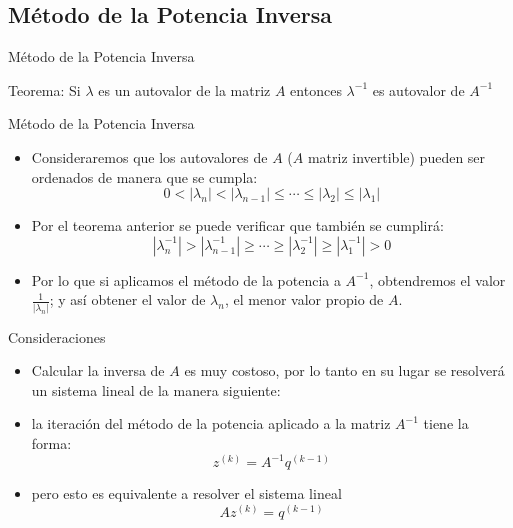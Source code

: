 \documentclass[11pt]{beamer}
\begin{document}
  \subsection{M\'etodo de la Potencia Inversa}
  \begin{frame}{M\'etodo de la Potencia Inversa}
    \begin{block}{Teorema:}
      Si $\lambda$ es un autovalor de la matriz $A$ entonces $\lambda^{-1}$ es autovalor
      de $A^{-1}$
      \end{block}
\end{frame}
\begin{frame}{M\'etodo de la Potencia Inversa}
  \begin{itemize}
    \item Consideraremos que los autovalores de $A$ ($A$ matriz invertible) pueden ser ordenados de manera que se cumpla:
    $$
    0 < |\lambda_n| < |\lambda_{n-1}| \leq \cdots \leq |\lambda_2| \leq |\lambda_1|
    $$
    \item<2-> Por el teorema anterior se puede verificar que tambi\'en se cumplir\'a:
    $$
    |\lambda_n^{-1}| > |\lambda_{n-1}^{-1}| \geq \cdots \geq |\lambda_2^{-1}| \geq |\lambda_1^{-1}| > 0
    $$
    \item<3-> Por lo que si aplicamos el m\'etodo de la potencia a $A^{-1}$, obtendremos el
    valor $\frac{1}{|\lambda_n|}$; y así obtener el valor de $\lambda_n$, el menor valor propio de $A$.
  \end{itemize}
  \end{frame}  
  \begin{frame}{Consideraciones}
    \begin{itemize}
      \item<1-> Calcular la inversa de $A$ es muy costoso, por lo tanto en su lugar se 
      resolver\'a un sistema lineal de la manera siguiente:
      \item<2-> la iteraci\'on del m\'etodo de la potencia aplicado a la matriz $A^{-1}$ tiene la forma:
      $$
      z^{(k)} = A^{-1}q^{(k-1)} 
      $$
      \item<3-> pero esto es equivalente a resolver el sistema lineal 
      $$
      Az^{(k)} = q^{(k-1)}
      $$
    \end{itemize}    
  \end{frame}
\end{document}
